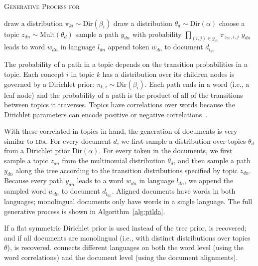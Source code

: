 \begin{algorithm}[t!]
\begin{footnotesize}
\caption{\textsc{\small{Generative Process for \ptlda{}}}}
\label{alg:ptlda}
\begin{algorithmic}[1]
  \STATE draw a distribution $\pi_{ki} \sim \text{Dir}(\beta_i)$
  \ENDFOR
  \ENDFOR
  \STATE draw a distribution $\theta_d \sim \text{Dir}(\alpha)$
  \STATE choose a topic $z_{dn} \sim \text{Mult}(\theta_d)$
  \STATE sample a path $y_{dn}$ with probability $\prod_{(i,j) \in y_{dn}} \pi_{z_{dn}, i, j}$
  \STATE $y_{dn}$ leads to word $w_{dn}$ in language $l_{dn}$
  \STATE append token $w_{dn}$ to document $d_{l_{dn}}$
  \ENDFOR
  \ENDFOR
\end{algorithmic}
\end{footnotesize}
\end{algorithm}


The probability of a path in a topic depends on the transition probabilities in a topic.  Each concept $i$ in topic $k$ has a distribution over its children nodes is governed by a Dirichlet prior: $\pi_{k,i} \sim \text{Dir}(\beta_{i})$.  Each path ends in a word (i.e., a leaf node) and the probability of a path is the product of all of the transitions between topics it traverses. Topics have correlations over words because the Dirichlet parameters can encode positive or negative correlations~\citep{andrzejewski-09}.

With these correlated in topics in hand, the generation of documents is very similar to \textsc{lda}.  For every document $d$, we first sample a distribution over topics $\theta_d$ from a Dirichlet prior $\text{Dir}(\alpha)$.  For every token in the documents, we first sample a topic $z_{dn}$ from the multinomial distribution $\theta_d$, and then sample a path $y_{dn}$ along the tree according to the transition distributions specified by topic $z_{dn}$.  Because every path $y_{dn}$ leads to a word $w_{dn}$ in language $l_{dn}$, we append the sampled word $w_{dn}$ to document $d_{l_{dn}}$.  Aligned documents have words in both languages; monolingual documents only have words in a single language. The full generative process is shown in Algorithm~\ref{alg:ptlda}.


If a flat symmetric Dirichlet prior is used instead of the tree prior, \plda{} is recovered; and if all documents are monolingual (i.e., with distinct distributions over topics $\theta$), \tlda{} is recovered. \ptlda{} connects different languages on both the word level (using the word correlations) and the document level (using the document alignments).

